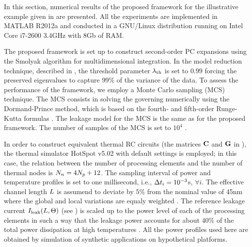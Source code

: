 In this section, numerical results of the proposed framework for the illustrative example given in  are presented. All the experiments are implemented in MATLAB R2012a \cite{matlab} and conducted in a GNU/Linux distribution running on Intel Core i7-2600 3.4GHz with 8Gb of RAM.

The proposed framework is set up to construct second-order PC expansions using the Smolyak algorithm for multidimensional integration. In the model reduction technique, described in , the threshold parameter $\lambda_\text{th}$ is set to $0.99$ forcing the preserved eigenvalues to capture $99\%$ of the variance of the data. To assess the performance of the framework, we employ a Monte Carlo sampling (MCS) technique. The MCS consists in solving the governing  numerically using the Dormand-Prince method, which is based on the fourth- and fifth-order Runge-Kutta formulas \cite{press2007}. The leakage model for the MCS is the same as for the proposed framework. The number of samples of the MCS is set to $10^4$ \cite{xiu2009}.

In order to construct equivalent thermal RC circuits (the matrices $\mC$ and $\mG$ in ), the thermal simulator HotSpot v5.02 \cite{hotspot} with default settings is employed; in this case, the relation between the number of processing elements and the number of thermal nodes is ${N_n} = 4 {N_p} + 12$. The sampling interval of power and temperature profiles is set to one millisecond, i.e., $\Delta t_i = 10^{-3}$s, $\forall i$. The effective channel length $L$ is assumend to deviate by $5\%$ from the nominal value of 45nm where the global and local variations are equaly weighted \cite{juan2012}. The reference leakage current $I_{\text{leak}}(L, \Theta)$ (see ) is scaled up to the power level of each of the processing elements in such a way that the leakage power accounts for about $40\%$ of the total power dissipation at high temperatures \cite{liu2007}. All the power profiles used here are obtained by simulation of synthetic applications on hypothetical platforms.

